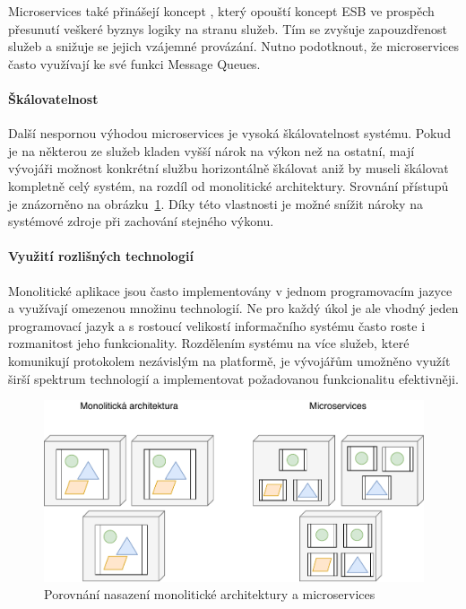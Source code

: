 Microservices také přinášejí koncept ,
který opouští koncept \gls{ESB} ve prospěch přesunutí veškeré byznys logiky
na stranu služeb. Tím se zvyšuje zapouzdřenost služeb a snižuje se
jejich vzájemné provázání. Nutno podotknout, že microservices často
využívají ke své funkci Message Queues.

\paragraph{Škálovatelnost}
Další nespornou výhodou microservices je vysoká škálovatelnost systému. Pokud je na
některou ze služeb kladen vyšší nárok na výkon než na ostatní, mají
vývojáři možnost konkrétní službu horizontálně škálovat aniž by
museli škálovat kompletně celý systém, na rozdíl od monolitické architektury.
Srovnání přístupů je znázorněno na obrázku~\ref{fig:microservices-deployment}.
Díky této vlastnosti je možné snížit nároky na systémové zdroje při zachování
stejného výkonu.

\paragraph{Využití rozlišných technologií}
Monolitické aplikace jsou často implementovány v jednom programovacím jazyce
a využívají omezenou množinu technologií. Ne pro každý úkol je ale vhodný
jeden programovací jazyk a s rostoucí velikostí informačního systému často roste
i rozmanitost jeho funkcionality. Rozdělením systému na více služeb, které
komunikují protokolem nezávislým na platformě, je vývojářům umožněno využít
širší spektrum technologií a implementovat požadovanou funkcionalitu
efektivněji.

\begin{figure}
    \centering
    \includegraphics[keepaspectratio=true, width=0.8\linewidth]{figures/microservices-deployment.pdf}
    \caption{Porovnání nasazení monolitické architektury a microservices}
    \label{fig:microservices-deployment}
\end{figure}

